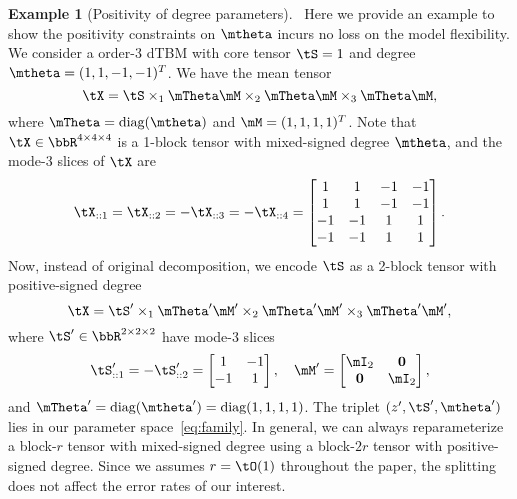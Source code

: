 \documentclass[lettersize,onecolumn,journal]{IEEEtran}
\theoremstyle{definition}
\theoremstyle{definition}
\newtheorem{example}{Example}
\begin{document}
\begin{example}[Positivity of degree parameters]~\label{ex:positive}
Here we provide an example to show the positivity constraints on $\mtheta$ incurs no loss on the model flexibility. 
{\color{blue}
We consider a order-3 dTBM with core tensor $\tS = 1$ and degree $\mtheta = (1,1,-1, -1)^T$. We have the mean tensor 
\begin{equation}
    \tX = \tS \times_1 \mTheta \mM \times_2 \mTheta \mM \times_3 \mTheta \mM,
\end{equation}
where $\mTheta = \text{diag}(\mtheta)$ and $\mM = (1,1,1,1)^T$. Note that $\tX \in \bbR^{4 \times 4 \times 4}$ is a 1-block tensor with mixed-signed degree $\mtheta$, and the mode-3 slices of $\tX$ are
\begin{equation}
    \tX_{::1} = \tX_{::2} = - \tX_{::3} = -\tX_{::4}  = \begin{bmatrix}
    1 & 1& -1& -1 \\
    1 & 1& -1& -1 \\
    -1& -1&1 & 1\\
     -1& -1&1 & 1
    \end{bmatrix}.
\end{equation}
Now, instead of original decomposition, we encode $\tS$ as a 2-block tensor with positive-signed degree
\begin{equation}
     \tX = \tS' \times_1 \mTheta' \mM' \times_2 \mTheta' \mM'  \times_3 \mTheta' \mM' , 
\end{equation}
where $\tS' \in \bbR^{2 \times 2 \times 2}$ have mode-3 slices 
\begin{equation}
    \tS'_{::1} = -\tS'_{::2} = \begin{bmatrix}
    1 & -1 \\
    -1 & 1
    \end{bmatrix}, \quad \mM' = \begin{bmatrix}
    \mI_2 & {\bf 0}\\
    {\bf 0} &  \mI_2
    \end{bmatrix},
\end{equation}
and $\mTheta' = \text{diag}(\mtheta') = \text{diag}(1,1, 1, 1)$. The triplet $(z',\tS', \mtheta')$ lies in our parameter space~\eqref{eq:family}. In general, we can always reparameterize a block-$r$ tensor with mixed-signed degree using a block-$2r$ tensor with positive-signed degree. Since we assumes $r=\tO(1)$ throughout the paper, the splitting does not affect the error rates of our interest.
}




\end{example}
\end{document}
